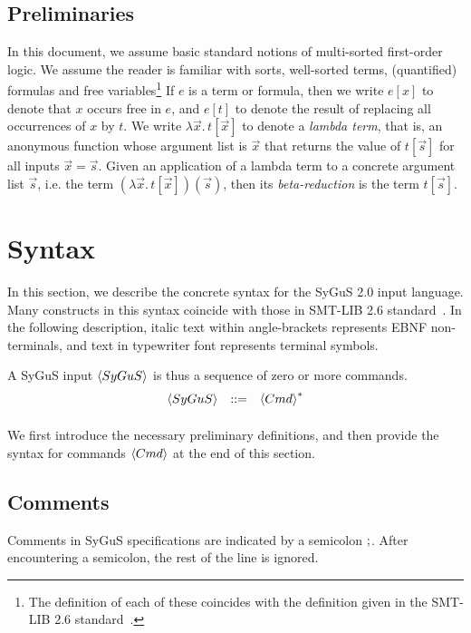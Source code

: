 \documentclass[english,a4paper,10pt]{article}
\begin{document}
\subsection{Preliminaries}
In this document, we assume basic standard notions of
multi-sorted first-order logic.
We assume the reader is familiar
with sorts, well-sorted terms, (quantified) formulas
and free variables\footnote{
The definition of each of these coincides with
the definition given in the SMT-LIB 2.6 standard~\cite{BarFT-RR-17}.
}
If $e$ is a term or formula,
then we write $e[x]$ to denote that $x$ occurs free in $e$,
and $e[t]$ to denote the result of replacing all occurrences of $x$ by $t$.
We write $\lambda \vec{x}.\, t[\vec{x}]$ to denote a \emph{lambda term},
that is, an anonymous function whose argument list is $\vec{x}$
that returns the value of $t[\vec{s}]$ for all inputs $\vec{x} = \vec{s}$.
Given an application of a lambda term to a concrete argument list $\vec{s}$,
i.e. the term $(\lambda \vec{x}.\, t[\vec{x}])( \vec{s} )$,
then its \emph{beta-reduction} is the term $t[\vec{s}]$.

\section{Syntax}
\label{sec:syntax}

In this section, we describe the concrete syntax
for the SyGuS 2.0 input language.
Many constructs in this syntax coincide
with those in SMT-LIB 2.6 standard~\cite{BarFT-RR-17}.
In the following description,
italic text within angle-brackets represents EBNF non-terminals,
and text in typewriter font represents terminal symbols.

A SyGuS input $\left\langle SyGuS\right\rangle$ is thus a sequence of zero or more commands.
\[
\begin{array}{rcl}
\left\langle SyGuS\right\rangle & ::= & \left\langle Cmd\right\rangle^{*}\\[2ex]
\end{array}
\]
We first introduce the necessary preliminary definitions,
and then provide the syntax for commands $\left\langle Cmd\right\rangle$ at the end of this section.

\subsection{Comments}

Comments in SyGuS specifications are indicated by a semicolon ${\tt ;}$.
After encountering a semicolon, the rest of the line is ignored.
\end{document}
